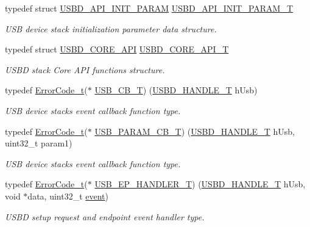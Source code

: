 \begin{DoxyCompactItemize}
typedef struct \hyperlink{struct_u_s_b_d___a_p_i___i_n_i_t___p_a_r_a_m}{U\+S\+B\+D\+\_\+\+A\+P\+I\+\_\+\+I\+N\+I\+T\+\_\+\+P\+A\+R\+AM} \hyperlink{group___u_s_b_d___core_gaa6e8171941c1ae63afed95974e0f18e3}{U\+S\+B\+D\+\_\+\+A\+P\+I\+\_\+\+I\+N\+I\+T\+\_\+\+P\+A\+R\+A\+M\+\_\+T}
\begin{DoxyCompactList}\small\item\em U\+SB device stack initialization parameter data structure. \end{DoxyCompactList}\item 
typedef struct \hyperlink{struct_u_s_b_d___c_o_r_e___a_p_i}{U\+S\+B\+D\+\_\+\+C\+O\+R\+E\+\_\+\+A\+PI} \hyperlink{group___u_s_b_d___core_ga6a53e8395d1c68f98d18ca4a49b75baa}{U\+S\+B\+D\+\_\+\+C\+O\+R\+E\+\_\+\+A\+P\+I\+\_\+T}
\begin{DoxyCompactList}\small\item\em U\+S\+BD stack Core A\+PI functions structure. \end{DoxyCompactList}\item 
typedef \hyperlink{error_8h_a905255056c349318139d94aa4523d516}{Error\+Code\+\_\+t}($\ast$ \hyperlink{group___u_s_b_d___core_ga0404ce046312aa5c798cc4a05c417e46}{U\+S\+B\+\_\+\+C\+B\+\_\+T}) (\hyperlink{group___u_s_b_d___core_gafdbb2204d929cb9d75736bd2b42342ac}{U\+S\+B\+D\+\_\+\+H\+A\+N\+D\+L\+E\+\_\+T} h\+Usb)
\begin{DoxyCompactList}\small\item\em U\+SB device stack\textquotesingle{}s event callback function type. \end{DoxyCompactList}\item 
typedef \hyperlink{error_8h_a905255056c349318139d94aa4523d516}{Error\+Code\+\_\+t}($\ast$ \hyperlink{group___u_s_b_d___core_ga7df622c61ebb152b83dd5972ac789b28}{U\+S\+B\+\_\+\+P\+A\+R\+A\+M\+\_\+\+C\+B\+\_\+T}) (\hyperlink{group___u_s_b_d___core_gafdbb2204d929cb9d75736bd2b42342ac}{U\+S\+B\+D\+\_\+\+H\+A\+N\+D\+L\+E\+\_\+T} h\+Usb, uint32\+\_\+t param1)
\begin{DoxyCompactList}\small\item\em U\+SB device stack\textquotesingle{}s event callback function type. \end{DoxyCompactList}\item 
typedef \hyperlink{error_8h_a905255056c349318139d94aa4523d516}{Error\+Code\+\_\+t}($\ast$ \hyperlink{group___u_s_b_d___core_gaa578d29a85226108ef62c6d5c325b742}{U\+S\+B\+\_\+\+E\+P\+\_\+\+H\+A\+N\+D\+L\+E\+R\+\_\+T}) (\hyperlink{group___u_s_b_d___core_gafdbb2204d929cb9d75736bd2b42342ac}{U\+S\+B\+D\+\_\+\+H\+A\+N\+D\+L\+E\+\_\+T} h\+Usb, void $\ast$data, uint32\+\_\+t \hyperlink{structevent}{event})
\begin{DoxyCompactList}\small\item\em U\+S\+BD setup request and endpoint event handler type. \end{DoxyCompactList}\end{DoxyCompactItemize}
